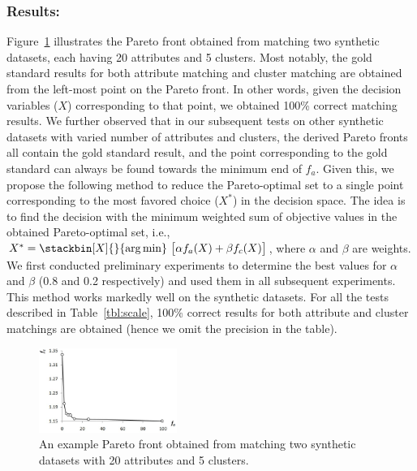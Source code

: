 \subsubsection{Results:}
Figure~\ref{fig:syn_pareto} illustrates the Pareto front obtained from matching two synthetic datasets, each having 20 attributes and 5 clusters. Most notably, the gold standard results for both attribute matching and cluster matching are obtained from the left-most point on the Pareto front. In other words, given the decision variables ($X$) corresponding to that point, we obtained 100\% correct matching results. We further observed that in our subsequent tests on other synthetic datasets with varied number of attributes and clusters, the derived Pareto fronts all contain the gold standard result, and the point corresponding to the gold standard can always be found towards the minimum end of $f_a$. Given this, we propose the following method to reduce the Pareto-optimal set to a single point corresponding to the most favored choice ($X^*$) in the decision space. The idea is to find the decision with the minimum weighted sum of objective values in the obtained Pareto-optimal set, i.e., $X^*=\stackbin[X]{}{\argmin}~\big[\alpha f_a(X)+\beta f_c(X)\big]$, where $\alpha$ and $\beta$ are weights. We first conducted preliminary experiments to determine the best values for $\alpha$ and $\beta$ (0.8 and 0.2 respectively) and used them in all subsequent experiments. This method works markedly well on the synthetic datasets. For all the tests described in Table~\ref{tbl:scale}, 100\% correct results for both attribute and cluster matchings are obtained (hence we omit the precision in the table).
\begin{figure}[tb]
\begin{center}
\includegraphics[width=0.4\textwidth]{fig/syn_pareto.eps}
\end{center}
\caption[An example Pareto front result from the synthetic dataset]{\label{fig:syn_pareto} An example Pareto front obtained from matching two synthetic datasets with 20 attributes and 5 clusters.}
\end{figure}

